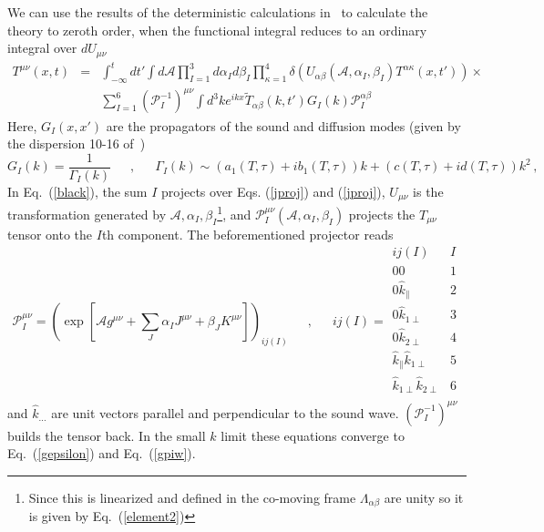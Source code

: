 \documentclass[12pt,onecolumn,showpacs,amssymb,aps,nofootinbib,floatfix]{revtex4-2}
\renewcommand{\eqref}[1]{Eq.~(\ref{#1})}
\newcommand{\eqcomma}{\phantom{AA},\phantom{AA}}
\begin{document}
	We can use the results of the deterministic calculations in~\cite{spal} to calculate the theory to zeroth order, when the functional integral reduces to an ordinary integral over $d U_{\mu \nu}$
	\begin{eqnarray}
		\label{black}
		T^{\mu \nu}(x,t) &=& \int^t_{-\infty} dt' \int  d \mathcal{A} \prod_{I=1}^3 d\alpha_I d\beta_{I} \prod_{\kappa=1}^4 \delta \left( U_{\alpha \beta} \left(\mathcal{A},\alpha_I,\beta_I \right)T^{\alpha \kappa}(x,t')
		\right) \times \nonumber \\ &&
		\sum_{I=1}^6 \left( \mathcal{P}^{-1}_I \right)^{\mu \nu} \int d^3 k e^{ikx}   \tilde{T}_{\alpha \beta}(k,t') G_I(k) \mathcal{P}_I^{ \alpha \beta}
	\end{eqnarray}
	Here, $G_I(x,x')$  are the propagators of the sound and diffusion modes (given by the dispersion 10-16 of~\cite{spal})
	\begin{equation}
		\label{propagator}
		G_I(k) =  \frac{1}{\Gamma_I (k)} \eqcomma \Gamma_I(k) \sim (a_1(T,\tau)+ib_1(T,\tau)) k+(c(T,\tau)+id(T,\tau))k^2\,,
	\end{equation}
	In \eqref{black}, the sum $I$ projects over Eqs. (\ref{jproj}) and (\ref{jproj}), $U_{\mu \nu}$ is the transformation generated by $\mathcal{A},\alpha_I,\beta_I$\footnote{Since this is linearized and defined in the co-moving frame $\Lambda_{\alpha \beta}$ are unity so it is given by \eqref{element2}}, and $\mathcal{P}_I^{\mu \nu}\left(\mathcal{A},\alpha_I,\beta_I \right)$ projects the $T_{\mu \nu}$ tensor onto the $I$th component. The beforementioned projector reads 
	\begin{equation}
		\label{pdef}
		\mathcal{P}_I^{\mu \nu} = \left( \exp\left[ \mathcal{A}g^{\mu \nu} + \sum_J \alpha_I J^{\mu \nu}+\beta_J K^{\mu \nu} \right] \right)_{ij(I)} \eqcomma ij(I) = \begin{array}{cc}
			ij(I) & I \\ \hline
			00 & 1\\
			0 \hat{k}_\parallel & 2\\
			0 \hat{k}_{1\perp} & 3\\
			0 \hat{k}_{2\perp} & 4\\
			\hat{k}_\parallel \hat{k}_{1\perp} & 5\\
			\hat{k}_{1\perp} \hat{k}_{2 \perp} & 6\\
		\end{array}
	\end{equation}
	and $\hat{k}_{...}$ are unit vectors parallel and perpendicular to the sound wave.
	$\left(\mathcal{P}_I^{-1}\right)^{\mu \nu}$ builds the tensor back. In the small $k$ limit these equations converge to \eqref{gepsilon} and \eqref{gpiw}.
	
\end{document}
